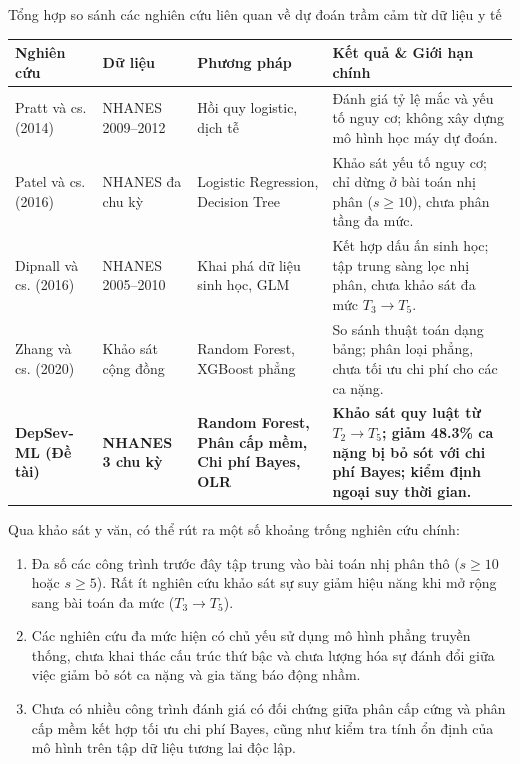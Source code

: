 \begin{table}[htbp]{Tổng hợp so sánh các nghiên cứu liên quan về dự đoán trầm cảm từ dữ liệu y tế}
\centering
\small
\setlength{\tabcolsep}{4.5pt}
\label{tab:related-works}
\begin{tabularx}{\textwidth}{p{3.2cm} p{2.2cm} p{3.2cm} X}
\toprule
\textbf{Nghiên cứu} & \textbf{Dữ liệu} & \textbf{Phương pháp} & \textbf{Kết quả \& Giới hạn chính} \\
\midrule
Pratt và cs. (2014) \cite{pratt2014depression} & NHANES 2009--2012 & Hồi quy logistic, dịch tễ & Đánh giá tỷ lệ mắc và yếu tố nguy cơ; không xây dựng mô hình học máy dự đoán. \\
\midrule
Patel và cs. (2016) \cite{patel2016systematic} & NHANES đa chu kỳ & Logistic Regression, Decision Tree & Khảo sát yếu tố nguy cơ; chỉ dừng ở bài toán nhị phân ($s \ge 10$), chưa phân tầng đa mức. \\
\midrule
Dipnall và cs. (2016) \cite{dipnall2016fusing} & NHANES 2005--2010 & Khai phá dữ liệu sinh học, GLM & Kết hợp dấu ấn sinh học; tập trung sàng lọc nhị phân, chưa khảo sát đa mức $T_3 \to T_5$. \\
\midrule
Zhang và cs. (2020) \cite{zhang2020machine} & Khảo sát cộng đồng & Random Forest, XGBoost phẳng & So sánh thuật toán dạng bảng; phân loại phẳng, chưa tối ưu chi phí cho các ca nặng. \\
\midrule
\textbf{DepSev-ML (Đề tài)} & \textbf{NHANES 3 chu kỳ} & \textbf{Random Forest, Phân cấp mềm, Chi phí Bayes, OLR} & \textbf{Khảo sát quy luật từ $T_2 \to T_5$; giảm 48.3\% ca nặng bị bỏ sót với chi phí Bayes; kiểm định ngoại suy thời gian.} \\
\bottomrule
\end{tabularx}
\end{table}

Qua khảo sát y văn, có thể rút ra một số khoảng trống nghiên cứu chính:
\begin{enumerate}
    \item Đa số các công trình trước đây tập trung vào bài toán nhị phân thô ($s \ge 10$ hoặc $s \ge 5$). Rất ít nghiên cứu khảo sát sự suy giảm hiệu năng khi mở rộng sang bài toán đa mức ($T_3 \to T_5$).
    \item Các nghiên cứu đa mức hiện có chủ yếu sử dụng mô hình phẳng truyền thống, chưa khai thác cấu trúc thứ bậc và chưa lượng hóa sự đánh đổi giữa việc giảm bỏ sót ca nặng và gia tăng báo động nhầm.
    \item Chưa có nhiều công trình đánh giá có đối chứng giữa phân cấp cứng và phân cấp mềm kết hợp tối ưu chi phí Bayes, cũng như kiểm tra tính ổn định của mô hình trên tập dữ liệu tương lai độc lập.
\end{enumerate}

